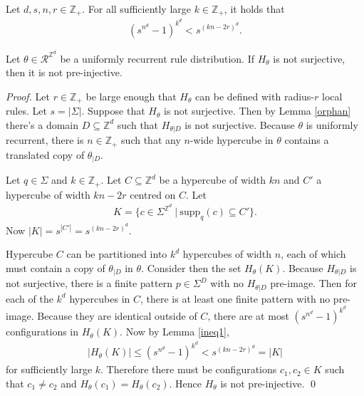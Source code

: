 \documentclass[runningheads]{llncs}
\newcommand{\Z}{\mathbb{Z}}
\newcommand{\set}[2]{\{ #1 \: | \: #2 \}}
\newcommand{\confspace}{\Sigma^{\Z^d}}
\begin{document}
\begin{lemma} \label{ineq1} 
\emph{\cite{moore}}
Let $d,s,n,r \in \Z_+$. For all sufficiently large $k \in \Z_+$, it holds that
\begin{align*}
(s^{n^d}-1)^{k^d} < s^{(kn-2r)^d}.
\end{align*}
\end{lemma} 


\begin{lemma} \label{goe_unif1}
Let $\theta \in \mathcal{R}^{\Z^d}$ be a uniformly recurrent rule distribution. If $H_\theta$ is not surjective, then it is not pre-injective.
\end{lemma}

\begin{proof}
Let $r \in \Z_+$ be large enough that $H_\theta$ can be defined with radius-$r$ local rules. Let $s = |\Sigma|$. Suppose that $H_\theta$ is not surjective. Then by Lemma \ref{orphan} there's a domain $D \subseteq \Z^d$ such that $H_{\theta|D}$ is not surjective. Because $\theta$ is uniformly recurrent, there is $n \in \Z_+$ such that any $n$-wide hypercube in $\theta$ contains a translated copy of $\theta_{|D}$.

Let $q \in \Sigma$ and $k\in \Z_+$. Let $C\subseteq \Z^d$  be a hypercube of width $kn$ and $C'$ a hypercube of width $kn-2r$ centred on $C$. Let
\begin{align*}
K = \set{c \in \confspace}{\mathrm{supp}_q (c) \subseteq C'}.
\end{align*} 
Now $|K| = s^{|C'|} = s^{(kn-2r)^d}$.

Hypercube $C$ can be partitioned into $k^d$ hypercubes of width $n$, each of which must contain a copy of $\theta_{|D}$ in $\theta$. Consider then the set $H_\theta (K)$. Because $H_{\theta|D}$ is not surjective, there is a finite pattern $p\in \Sigma^D$ with no $H_{\theta|D}$ pre-image. Then for each of the $k^d$ hypercubes in $C$, there is at least one finite pattern with no pre-image. Because they are identical outside of $C$, there are at most $(s^{n^d}-1)^{k^d}$ configurations in $H_\theta (K)$. Now by Lemma \ref{ineq1},
\begin{align*}
|H_\theta(K)| \leq (s^{n^d}-1)^{k^d} < s^{(kn-2r)^d} = |K|
\end{align*}
for sufficiently large $k$. Therefore there must be configurations $c_1,c_2 \in K$ such that $c_1 \neq c_2$ and $H_\theta (c_1) = H_\theta(c_2)$. Hence $H_\theta$ is not pre-injective.
\qed
\end{proof}
\end{document}
